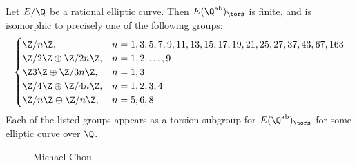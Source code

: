 \begin{frame}[plain]
\footnotesize
\begin{thm}[Chou, 2019]
Let $E/\Q$ be a rational elliptic curve. Then $E(\Q^{\text{ab}})_\tors$ is finite, and is isomorphic to precisely one of the following groups:
	\[
	\begin{cases}
	\Z/n\Z, & n= 1, 3, 5, 7, 9, 11, 13, 15, 17, 19, 21, 25, 27, 37, 43, 67, 163 \\
	\Z/2\Z \oplus \Z/2n\Z, & n= 1, 2, \ldots, 9 \\
	\Z3\Z \oplus \Z/3n\Z, & n= 1, 3 \\
	\Z/4\Z \oplus \Z/4n\Z, & n= 1, 2, 3, 4 \\
	\Z/n\Z \oplus \Z/n\Z, & n= 5, 6, 8
	\end{cases}
	\]
Each of the listed groups appears as a torsion subgroup for $E(\Q^{\text{ab}})_\tors$ for some elliptic curve over $\Q$. 
\end{thm}
	\begin{figure}[!ht]
	\centering
	\captionsetup{labelformat=empty}
	\caption{Michael Chou}
	\end{figure}
\end{frame}






\begin{frame}[plain]
\end{frame}





